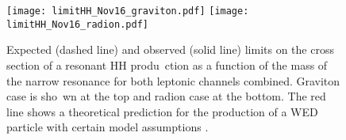 

\begin{figure}[!htb]%
  \begin{center}
    \texttt{[image: limitHH\_Nov16\_graviton.pdf]}
    \texttt{[image: limitHH\_Nov16\_radion.pdf]}
    \caption{ Expected (dashed line) and observed (solid line) limits on the cross section of a resonant HH produ\
ction
      as a function of the mass of the narrow resonance for both leptonic channels combined. Graviton case is sho\
wn at the top and radion case at the bottom. The red line shows a theoretical prediction for
      the production of a WED particle with certain model assumptions \cite{Oliveira:2014kla}.
      }


    \label{fig:HHlimits} %
  \end{center}
\end{figure}




